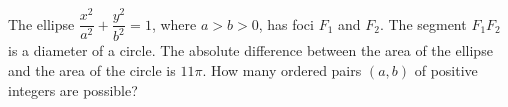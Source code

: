 The ellipse $\dfrac{x^2}{a^2}+\dfrac{y^2}{b^2}=1$, where $a>b>0$, has foci $F_1$ and $F_2$. The segment $F_1F_2$ is a diameter of a circle. The absolute difference between the area of the ellipse and the area of the circle is $11\pi$. How many ordered pairs $(a,b)$ of positive integers are possible?
